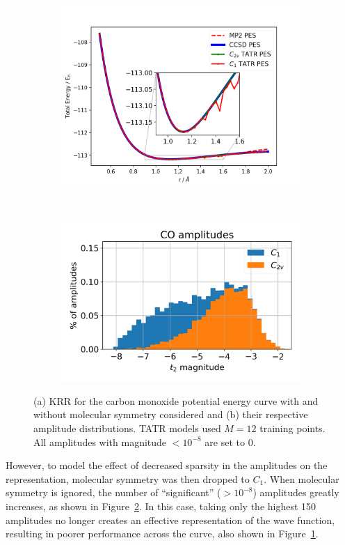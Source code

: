 \begin{figure}
    \begin{subfigure}{.5\textwidth}
        \centering
        \includegraphics[scale=.8]{p2/figures/co_pes.png}
        \caption{}
        \label{fig:both_co_pes}
    \end{subfigure}\\
    \begin{subfigure}{.5\textwidth}
        \centering
        \includegraphics[scale=.8]{p2/figures/amp_dist.png}
        \caption{}
        \label{fig:amp_dist}
    \end{subfigure}
    \caption{(a) KRR for the carbon monoxide potential energy curve with and without molecular symmetry considered and (b) their respective amplitude distributions. TATR models used $M = 12$ training points. All amplitudes with magnitude $< 10^{-8}$ are set to 0.}
    \label{fig:CO_PES}
\end{figure}
However, to model the effect of decreased sparsity in the amplitudes on the representation, molecular symmetry was then dropped to $C_1$. When molecular symmetry is ignored, the number of ``significant'' ($>10^{-8}$) amplitudes greatly increases, as shown in Figure~\ref{fig:amp_dist}. 
In this case, taking only the highest 150 amplitudes no longer creates an effective representation of the wave function, resulting in poorer performance across the curve, also shown in Figure~\ref{fig:both_co_pes}.


